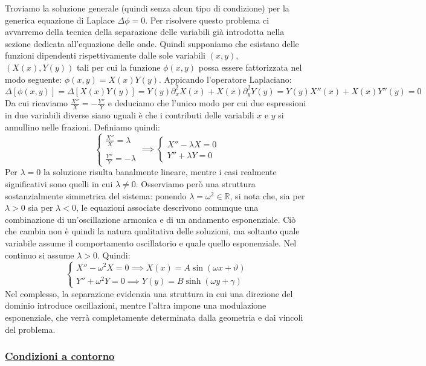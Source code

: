 \documentclass[a4paper,12pt]{report}
\newcommand{\lt}{<}
\newcommand{\gt}{>}
\begin{document}
Troviamo la soluzione generale (quindi senza alcun tipo di condizione) per la generica equazione di Laplace $\Delta\phi=0$. Per risolvere questo problema ci avvarremo della tecnica della separazione delle variabili già introdotta nella sezione dedicata all'equazione delle onde. Quindi supponiamo che esistano delle funzioni dipendenti rispettivamente dalle sole variabili $(x,y)$, $(X(x),Y(y))$ tali per cui la funzione $\phi(x,y)$ possa essere fattorizzata nel modo seguente: $\phi(x,y)=X(x)Y(y)$. Appicando l'operatore Laplaciano:
\[\Delta[\phi(x,y)]=\Delta[X(x)Y(y)]=Y(y)\partial_x^2X(x)+X(x)\partial_y^2Y(y)=Y(y)X''(x)+X(x)Y''(y)=0\]
Da cui ricaviamo $\displaystyle\frac{X''}{X}=-\frac{Y''}{Y}$ e deduciamo che l'unico modo per cui due espressioni in due variabili diverse siano uguali è che i contributi delle variabili $x$ e $y$ si annullino nelle frazioni. Definiamo quindi:
\[\begin{cases}
    \frac{X''}{X}=\lambda
    \\
    \\\frac{Y''}{Y}=-\lambda
\end{cases}\implies \begin{cases}
    X''-\lambda X=0
    \\ Y''+\lambda Y=0
\end{cases}\]
Per $\lambda=0$ la soluzione risulta banalmente lineare, mentre i casi realmente significativi sono quelli in cui $\lambda\neq0$. Osserviamo però una struttura sostanzialmente simmetrica del sistema: ponendo $\lambda=\omega^2\in \mathbb{R}$, si nota che, sia per $\lambda\gt 0$ sia per $\lambda\lt0$, le equazioni associate descrivono comunque una combinazione di un’oscillazione armonica e di un andamento esponenziale. Ciò che cambia non è quindi la natura qualitativa delle soluzioni, ma soltanto quale variabile assume il comportamento oscillatorio e quale quello esponenziale. Nel continuo si assume $\lambda\gt0$. Quindi:
\[\begin{cases}
    X''-\omega^2X=0\implies X(x)=A\sin(\omega x+\vartheta)
    \\Y''+\omega^2Y=0\implies Y(y)=B\sinh(\omega y+\gamma)
\end{cases}\]
Nel complesso, la separazione evidenzia una struttura in cui una direzione del dominio introduce oscillazioni, mentre l’altra impone una modulazione esponenziale, che verrà completamente determinata dalla geometria e dai vincoli del problema.

\subsubsection{\underline{Condizioni a contorno}}
\end{document}
